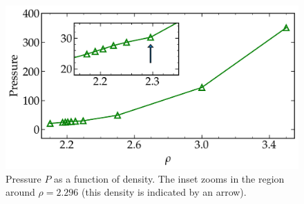 \begin{figure}
\centering
\includegraphics[width=15cm]{figs/fig6p2.pdf}
\caption[{\em Pressure $P$ as a function of density}]{Pressure $P$ as a function of density. The inset zooms in the region around $\rho = 2.296$ (this density is indicated by an arrow). 
\label{fig6p2}}
\end{figure}
%
